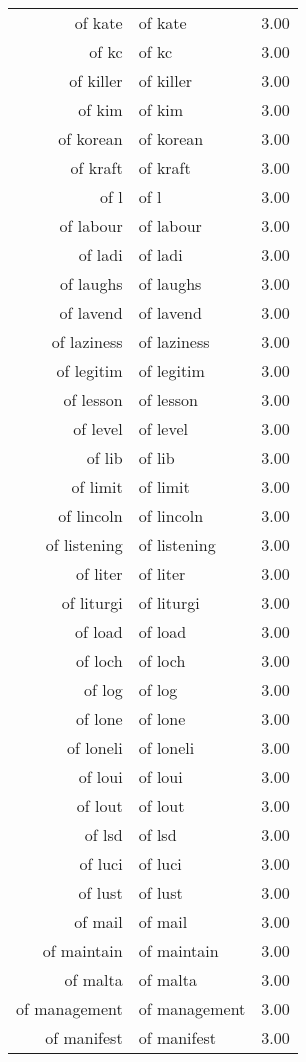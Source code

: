 \begin{table}[ht]
\begin{tabular}{rlr}
  of kate & of kate & 3.00 \\ 
  of kc & of kc & 3.00 \\ 
  of killer & of killer & 3.00 \\ 
  of kim & of kim & 3.00 \\ 
  of korean & of korean & 3.00 \\ 
  of kraft & of kraft & 3.00 \\ 
  of l & of l & 3.00 \\ 
  of labour & of labour & 3.00 \\ 
  of ladi & of ladi & 3.00 \\ 
  of laughs & of laughs & 3.00 \\ 
  of lavend & of lavend & 3.00 \\ 
  of laziness & of laziness & 3.00 \\ 
  of legitim & of legitim & 3.00 \\ 
  of lesson & of lesson & 3.00 \\ 
  of level & of level & 3.00 \\ 
  of lib & of lib & 3.00 \\ 
  of limit & of limit & 3.00 \\ 
  of lincoln & of lincoln & 3.00 \\ 
  of listening & of listening & 3.00 \\ 
  of liter & of liter & 3.00 \\ 
  of liturgi & of liturgi & 3.00 \\ 
  of load & of load & 3.00 \\ 
  of loch & of loch & 3.00 \\ 
  of log & of log & 3.00 \\ 
  of lone & of lone & 3.00 \\ 
  of loneli & of loneli & 3.00 \\ 
  of loui & of loui & 3.00 \\ 
  of lout & of lout & 3.00 \\ 
  of lsd & of lsd & 3.00 \\ 
  of luci & of luci & 3.00 \\ 
  of lust & of lust & 3.00 \\ 
  of mail & of mail & 3.00 \\ 
  of maintain & of maintain & 3.00 \\ 
  of malta & of malta & 3.00 \\ 
  of management & of management & 3.00 \\ 
  of manifest & of manifest & 3.00 \\ 

\end{tabular}
\end{table}
